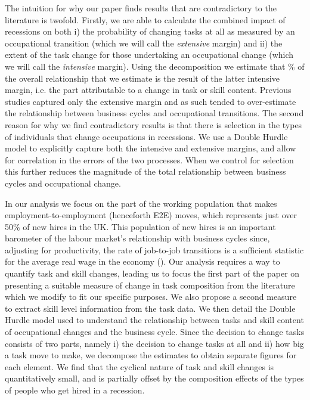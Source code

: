 \documentclass[11pt, oneside]{article}
\begin{document}
	
	


	\vspace{2mm}


\noindent The intuition for why our paper finds results that are contradictory to the literature is twofold.  Firstly, we are able to calculate the combined impact of recessions on both i) the probability of changing tasks at all as measured by an occupational transition (which we will call the \textit{extensive} margin) and ii) the extent of the task change for those undertaking an occupational change (which we will call the \textit{intensive} margin). Using the \cite{Mcdonald1980} decomposition we estimate that \hspace{-1mm}\% of the overall relationship that we estimate is the result of the latter intensive margin, i.e. the part attributable to a change in task or skill content. Previous studies captured only the extensive margin and as such tended to over-estimate the relationship between business cycles and occupational transitions. The second reason for why we find contradictory results is that there is selection in the types of individuals that change occupations in recessions. We use a Double Hurdle model to explicitly capture both the intensive and extensive margins, and allow for correlation in the errors of the two processes. When we control for selection this further reduces the magnitude of the total relationship between business cycles and occupational change.



	
	\vspace{2mm}
	
	In our analysis we focus on the part of the working population that makes employment-to-employment (henceforth E2E) moves, which represents just over 50\% of new hires in the UK. This population of new hires is an important barometer of the labour market's relationship with  business cycles since, adjusting for productivity, the rate of job-to-job transitions is a sufficient statistic for the average real wage in the economy (\cite{MoscariniPostelVinay}). Our analysis requires a way to quantify task and skill changes, leading us to focus the first part of the paper on presenting a suitable measure of change in task composition from the literature which we modify to fit our specific purposes. We also propose a second measure to extract skill level information from the task data. We then detail the Double Hurdle model used to understand the relationship between tasks and skill content of occupational changes and the business cycle. Since the decision to change tasks consists of two parts, namely i) the decision to change tasks at all and ii) how big a task move to make, we decompose the estimates to obtain separate figures for each element. We find that the cyclical nature of task and skill changes is quantitatively small, and is partially offset by the composition effects of the types of people who get hired in a recession. 
	
\end{document}
